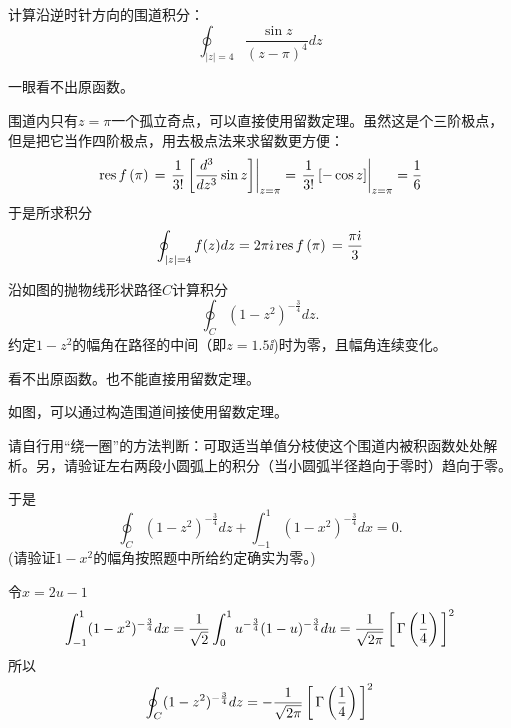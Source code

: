 \documentclass[CJK]{beamer}
\begin{document}

\begin{frame}
\chtitle{\proid (\stwo)}
\bch
计算沿逆时针方向的围道积分：
$$\oint_{|z|=4}\frac{\sin z}{(z-\pi)^4}dz$$
\ech
\end{frame}

\begin{frame}
\bch
一眼看不出原函数。

围道内只有$z=\pi$一个孤立奇点，可以直接使用留数定理。虽然这是个三阶极点，但是把它当作四阶极点，用去极点法来求留数更方便：
$$\,\mathrm{res}\,f\left(\pi\right)\, = \left.\frac{1}{3!}\left[\frac{d^3}{dz^3} \sin z\right] \right\vert_{z=\pi} = \left.\frac{1}{3!}\left[-\cos z\right] \right\vert_{z=\pi} = \frac{1}{6} $$
于是所求积分
$$\oint_{|z|=4}f(z) dz = 2\pi{\dot{\imath}} \,\mathrm{res}\,f\left(\pi\right)\, = \frac{\pi {\dot{\imath}}}{3}$$

\ech
\end{frame}

\begin{frame}
\chtitle{\proid (\sthree)}
\bch
{}

沿如图的抛物线形状路径$C$计算积分
$$\oint_C (1-z^2)^{-\frac{3}{4}} dz. $$
约定$1-z^2$的幅角在路径的中间（即$z=1.5\ii$)时为零，且幅角连续变化。
\ech
\end{frame}


\begin{frame}
\bch

看不出原函数。也不能直接用留数定理。


如图，可以通过构造围道间接使用留数定理。

请自行用“绕一圈”的方法判断：可取适当单值分枝使这个围道内被积函数处处解析。另，请验证左右两段小圆弧上的积分（当小圆弧半径趋向于零时）趋向于零。


\ech
\end{frame}

\begin{frame}
\bch
于是
$$\oint_C (1-z^2)^{-\frac{3}{4}} dz + \int_{-1}^1(1-x^2)^{-\frac{3}{4}} dx = 0.$$
{\small (请验证$1-x^2$的幅角按照题中所给约定确实为零。)}

令$x=2u-1$
$$\int_{-1}^1(1-x^2)^{-\frac{3}{4}} dx= \frac{1}{\sqrt{2}}\int_0^1u^{-\frac{3}{4}}(1-u)^{-\frac{3}{4}} du = \frac{1}{\sqrt{2\pi}} \left[\,\Gamma\left( \frac{1}{4} \right)\,\right]^2 $$
所以
$$\oint_C (1-z^2)^{-\frac{3}{4}} dz = -\frac{1}{\sqrt{2\pi}} \left[\,\Gamma\left( \frac{1}{4} \right)\,\right]^2$$
\ech
\end{frame}
\end{document}
